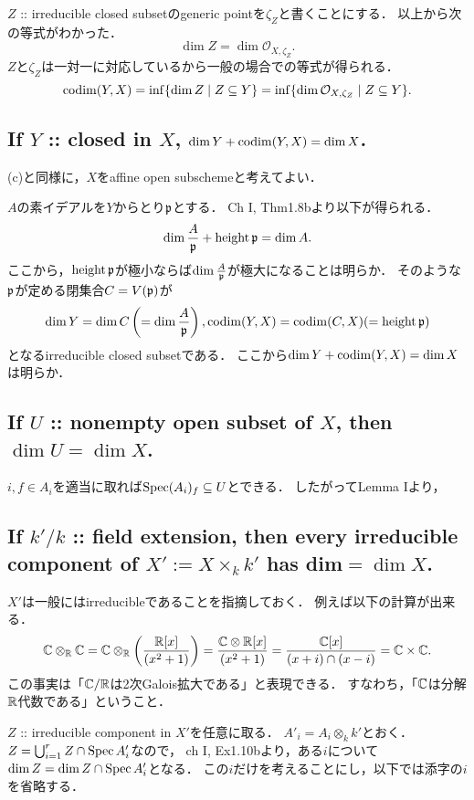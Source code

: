 \documentclass[a4paper]{jsarticle}
\newcommand{\shO}{\mathcal{O}}
\begin{document}
    $Z$ :: irreducible closed subsetのgeneric pointを$\zeta_Z$と書くことにする．
    以上から次の等式がわかった．
    \[ \dim Z=\dim \shO_{X,\zeta_Z}. \]
    $Z$と$\zeta_Z$は一対一に対応しているから一般の場合での等式が得られる．
    \[
        \codim(Y,X)
        =\inf \{ \dim Z \mid Z \subseteq Y \}
        =\inf \{ \dim \shO_{X,\zeta_Z} \mid Z \subseteq Y \}.
    \]

    \subsection{If $Y$ :: closed in $X$, $\dim Y+\operatorname{codim}(Y,X)=\dim X$.}
    (c)と同様に，$X$をaffine open subschemeと考えてよい．

    $A$の素イデアルを$Y$からとり$\mathfrak{p}$とする．
    Ch I, Thm1.8bより以下が得られる．
    \[ \dim \frac{A}{\mathfrak{p}}+\operatorname{height} \mathfrak{p}=\dim A. \]
    ここから，$\operatorname{height} \mathfrak{p}$が極小ならば$\dim \frac{A}{\mathfrak{p}}$が極大になることは明らか．
    そのような$\mathfrak{p}$が定める閉集合$C=V(\mathfrak{p})$が
    \[ \dim Y=\dim C\left(=\dim \frac{A}{\mathfrak{p}}\right), \operatorname{codim} (Y,X)=\operatorname{codim}(C,X)(=\operatorname{height} \mathfrak{p}) \]
    となるirreducible closed subsetである．
    ここから$\dim Y+\operatorname{codim}(Y,X)=\dim X$は明らか．

    \subsection{If $U$ :: nonempty open subset of $X$, then $\dim U = \dim X$.}
    $i, f \in A_i$を適当に取れば$\operatorname{Spec} (A_i)_f \subseteq U$とできる．
    したがってLemma Iより，

    \subsection{If $k'/k$ :: field extension, then every irreducible component of $X':=X \times_k k'$ has dim$=\dim X$.}
    $X'$は一般にはirreducibleであることを指摘しておく．
    例えば以下の計算が出来る．
    \[
        \mathbb{C} \otimes_{\mathbb{R}} \mathbb{C}
        =\mathbb{C} \otimes_{\mathbb{R}} \left(\frac{\mathbb{R}[x]}{(x^2+1)}\right)
        =\frac{\mathbb{C} \otimes \mathbb{R}[x]}{(x^2+1)}
        =\frac{\mathbb{C}[x]}{(x+i) \cap (x-i)}
        =\mathbb{C} \times \mathbb{C}.
    \]
    この事実は「$\mathbb{C}/\mathbb{R}$は2次Galois拡大である」と表現できる．
    すなわち，「$\mathbb{C}$は分解$\mathbb{R}$代数である」ということ．

    $Z$ :: irreducible component in $X'$を任意に取る．
    $A'_i=A_i \otimes_k k'$とおく．
    $Z=\bigcup_{i=1}^r Z \cap \operatorname{Spec} A'_i$なので，
    ch I, Ex1.10bより，ある$i$について$\dim Z=\dim Z \cap \operatorname{Spec} A'_i$となる．
    この$i$だけを考えることにし，以下では添字の$i$を省略する．
\end{document}
